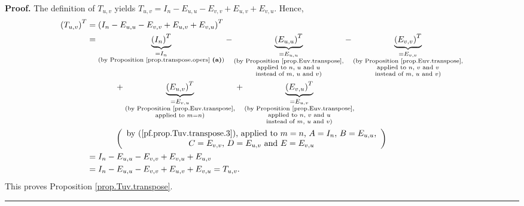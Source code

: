 \documentclass[numbers=enddot,12pt,final,onecolumn,notitlepage]{scrartcl}%
\theoremstyle{definition}
\newenvironment{proof}[1][Proof]{\noindent\textbf{#1.} }{\ \rule{0.5em}{0.5em}}
\begin{document}
\begin{proof}
The definition of $T_{u,v}$ yields $T_{u,v}=I_{n}-E_{u,u}-E_{v,v}%
+E_{u,v}+E_{v,u}$. Hence,%
\begin{align*}
\left(  T_{u,v}\right)  ^{T}  &  =\left(  I_{n}-E_{u,u}-E_{v,v}+E_{u,v}%
+E_{v,u}\right)  ^{T}\\
&  =\underbrace{\left(  I_{n}\right)  ^{T}}_{\substack{=I_{n}\\\text{(by
Proposition \ref{prop.transpose.opers} \textbf{(a)})}}}-\underbrace{\left(
E_{u,u}\right)  ^{T}}_{\substack{=E_{u,u}\\\text{(by Proposition
\ref{prop.Euv.transpose},}\\\text{applied to }n\text{, }u\text{ and
}u\\\text{instead of }m\text{, }u\text{ and }v\text{)}}}-\underbrace{\left(
E_{v,v}\right)  ^{T}}_{\substack{=E_{v,v}\\\text{(by Proposition
\ref{prop.Euv.transpose},}\\\text{applied to }n\text{, }v\text{ and
}v\\\text{instead of }m\text{, }u\text{ and }v\text{)}}}\\
&  \ \ \ \ \ \ \ \ \ \ +\underbrace{\left(  E_{u,v}\right)  ^{T}%
}_{\substack{=E_{v,u}\\\text{(by Proposition \ref{prop.Euv.transpose}%
,}\\\text{applied to }m=n\text{)}}}+\underbrace{\left(  E_{v,u}\right)  ^{T}%
}_{\substack{=E_{u,v}\\\text{(by Proposition \ref{prop.Euv.transpose}%
,}\\\text{applied to }n\text{, }v\text{ and }u\\\text{instead of }m\text{,
}u\text{ and }v\text{)}}}\\
&  \ \ \ \ \ \ \ \ \ \ \left(
\begin{array}
[c]{c}%
\text{by (\ref{pf.prop.Tuv.transpose.3}), applied to }m=n\text{, }%
A=I_{n}\text{, }B=E_{u,u}\text{,}\\
C=E_{v,v}\text{, }D=E_{u,v}\text{ and }E=E_{v,u}%
\end{array}
\right) \\
&  =I_{n}-E_{u,u}-E_{v,v}+E_{v,u}+E_{u,v}\\
&  =I_{n}-E_{u,u}-E_{v,v}+E_{u,v}+E_{v,u}=T_{u,v}.
\end{align*}
This proves Proposition \ref{prop.Tuv.transpose}.
\end{proof}
\end{document}
